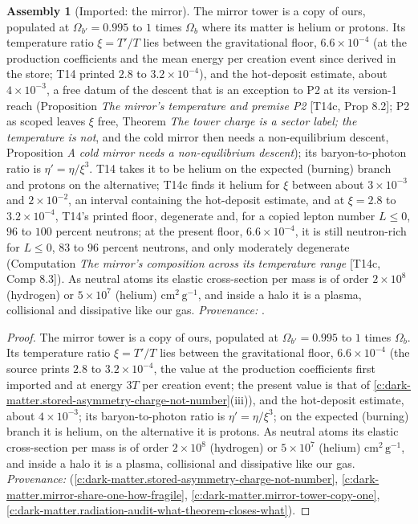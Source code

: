 \documentclass[11pt]{article}
\theoremstyle{definition}
\newtheorem{assembled}[theorem]{Assembly}
\theoremstyle{plain}
\newcommand{\changedmark}[2]{\marginpar{\raggedright\scriptsize\color{#1}#2}}
\providecommand{\cmg}{}\renewcommand{\cmg}{\mathrm{cm^{2}\,g^{-1}}}
\begin{document}
\begin{assembled}[Imported: the mirror]\label{c:simulations.imported-mirror}
\changedmark{BurntOrange}{changed since the deposit}
The mirror tower is a copy of ours, populated at $\Omega_{b'} = 0.995$ to $1$ times $\Omega_{b}$ where its matter is helium or protons. Its temperature ratio $\xi = T'/T$ lies between the gravitational floor, $6.6 \times 10^{-4}$ (at the production coefficients and the mean energy per creation event since derived in the store; T14 printed $2.8$ to $3.2 \times 10^{-4}$), and the hot-deposit estimate, about $4 \times 10^{-3}$, a free datum of the descent that is an exception to P2 at its version-1 reach (Proposition \emph{The mirror's temperature and premise P2} [T14c, Prop 8.2]; P2 as scoped leaves $\xi$ free, Theorem \emph{The tower charge is a sector label; the temperature is not}, and the cold mirror then needs a non-equilibrium descent, Proposition \emph{A cold mirror needs a non-equilibrium descent}); its baryon-to-photon ratio is $\eta' = \eta/\xi^{3}$. T14 takes it to be helium on the expected (burning) branch and protons on the alternative; T14c finds it helium for $\xi$ between about $3 \times 10^{-3}$ and $2 \times 10^{-2}$, an interval containing the hot-deposit estimate, and at $\xi = 2.8$ to $3.2 \times 10^{-4}$, T14's printed floor, degenerate and, for a copied lepton number $L \leq 0$, $96$ to $100$ percent neutrons; at the present floor, $6.6 \times 10^{-4}$, it is still neutron-rich for $L \leq 0$, $83$ to $96$ percent neutrons, and only moderately degenerate (Computation \emph{The mirror's composition across its temperature range} [T14c, Comp 8.3]). As neutral atoms its elastic cross-section per mass is of order $2 \times 10^{8}$ (hydrogen) or $5 \times 10^{7}$ (helium) $\cmg$, and inside a halo it is a plasma, collisional and dissipative like our gas. \emph{Provenance:} \cite[Thm.~4.3, Props.~4.6 and 4.7, Prop.~6.2]{ButlerT14}.
\end{assembled}
\begin{proof}
The mirror tower is a copy of ours, populated at $\Omega_{b'} = 0.995$ to $1$ times $\Omega_{b}$. Its temperature ratio $\xi = T'/T$ lies between the gravitational floor, $6.6 \times 10^{-4}$ (the source prints $2.8$ to $3.2 \times 10^{-4}$, the value at the production coefficients first imported and at energy $3T$ per creation event; the present value is that of \ref{c:dark-matter.stored-asymmetry-charge-not-number}(iii)), and the hot-deposit estimate, about $4 \times 10^{-3}$; its baryon-to-photon ratio is $\eta' = \eta/\xi^{3}$; on the expected (burning) branch it is helium, on the alternative it is protons. As neutral atoms its elastic cross-section per mass is of order $2 \times 10^{8}$ (hydrogen) or $5 \times 10^{7}$ (helium) $\cmg$, and inside a halo it is a plasma, collisional and dissipative like our gas. \emph{Provenance:} \cite[Thm.~4.3, Props.~4.6 and 4.7, Prop.~6.2]{ButlerT14} (\ref{c:dark-matter.stored-asymmetry-charge-not-number}, \ref{c:dark-matter.mirror-share-one-how-fragile}, \ref{c:dark-matter.mirror-tower-copy-one}, \ref{c:dark-matter.radiation-audit-what-theorem-closes-what}).

\end{proof}
\end{document}
